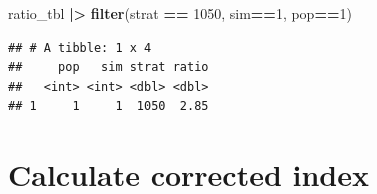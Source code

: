 \documentclass[
]{article}
\newenvironment{Shaded}{\begin{snugshade}}{\end{snugshade}}
\newcommand{\DecValTok}[1]{\textcolor[rgb]{0.00,0.00,0.81}{#1}}
\newcommand{\FunctionTok}[1]{\textcolor[rgb]{0.13,0.29,0.53}{\textbf{#1}}}
\newcommand{\NormalTok}[1]{#1}
\newcommand{\SpecialCharTok}[1]{\textcolor[rgb]{0.81,0.36,0.00}{\textbf{#1}}}
\begin{document}
\begin{Shaded}
\begin{Highlighting}[]
\NormalTok{ratio\_tbl }\SpecialCharTok{|\textgreater{}} \FunctionTok{filter}\NormalTok{(strat }\SpecialCharTok{==} \DecValTok{1050}\NormalTok{, sim}\SpecialCharTok{==}\DecValTok{1}\NormalTok{, pop}\SpecialCharTok{==}\DecValTok{1}\NormalTok{)}
\end{Highlighting}
\end{Shaded}

\begin{verbatim}
## # A tibble: 1 x 4
##     pop   sim strat ratio
##   <int> <int> <dbl> <dbl>
## 1     1     1  1050  2.85
\end{verbatim}

\section{Calculate corrected index}\label{calculate-corrected-index}
\end{document}
